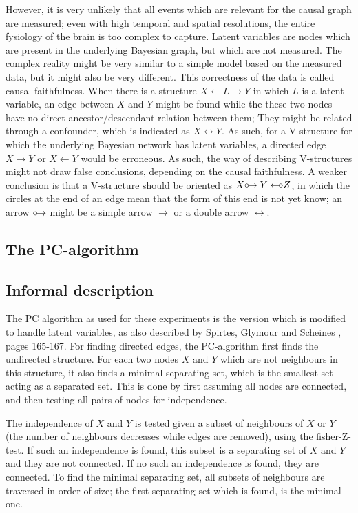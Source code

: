 \documentclass[a4paper, 10pt, english, onecolumn]{article}
\def \orightarrow {\circ\hspace{-0.42em}\rightarrow}
\def \oleftarrow {\leftarrow\hspace{-0.42em}\circ}
\begin{document}
However, it is very unlikely that all events which are relevant for the causal graph are measured; 
even with high temporal and spatial resolutions, the entire fysiology of the brain is too complex to capture.
Latent variables are nodes which are present in the underlying Bayesian graph, but which are not measured.
The complex reality might be very similar to a simple model based on the measured data, but it might also be very different.
This correctness of the data is called causal faithfulness.
When there is a structure $X \leftarrow L \rightarrow Y$ in which $L$ is a latent variable, an edge between $X$ and $Y$ might be found while the these two nodes have no direct ancestor/descendant-relation between them;
They might be related through a confounder, which is indicated as $X \leftrightarrow Y$.
As such, for a V-structure for which the underlying Bayesian network has latent variables, a directed edge $X \rightarrow Y$ or $X \leftarrow Y$ would be erroneous. 
As such, the way of describing V-structures might not draw false conclusions, depending on the causal faithfulness. 
A weaker conclusion is that a V-structure should be oriented as $X \orightarrow Y \oleftarrow Z$, in which the circles at the end of an edge mean that the form of this end is not yet know; an arrow $\orightarrow$ might be a simple arrow $\rightarrow$ or a double arrow $\leftrightarrow$.

\subsection{The PC-algorithm}

\subsection{Informal description}
The PC algorithm as used for these experiments is the version which is modified to handle latent variables, as also described by Spirtes, Glymour and Scheines \cite{spirtes2000}, pages 165-167.
For finding directed edges, the PC-algorithm first finds the undirected structure.
For each two nodes $X$ and $Y$ which are not neighbours in this structure, it also finds a minimal separating set, which is the smallest set acting as a separated set.
This is done by first assuming all nodes are connected, and then testing all pairs of nodes for independence.

The independence of $X$ and $Y$ is tested given a subset of neighbours of $X$ or $Y$ (the number of neighbours decreases while edges are removed), using the fisher-Z-test.
If such an independence is found, this subset is a separating set of $X$ and $Y$ and they are not connected.
If no such an independence is found, they are connected.
To find the minimal separating set, all subsets of neighbours are traversed in order of size; the first separating set which is found, is the minimal one.
\end{document}
